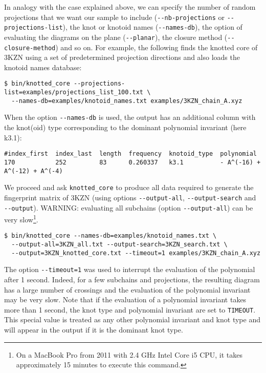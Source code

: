 In analogy with the case explained above, we can specify the number of random projections that we want our sample to include (\lstinline{--nb-projections} or \lstinline{--projections-list}), the knot or knotoid names (\lstinline{--names-db}), the option of evaluating the diagrams on the plane (\lstinline{--planar}), the closure method (\lstinline{--closure-method}) and so on. For example, the following finds the knotted core of 3KZN using a set of predetermined projection directions and also loads the knotoid names database:
\begin{lstlisting}
$ bin/knotted_core --projections-list=examples/projections_list_100.txt \ 
  --names-db=examples/knotoid_names.txt examples/3KZN_chain_A.xyz
\end{lstlisting}
When the option \lstinline{--names-db} is used, the output has an additional column with the knot(oid) type corresponding to the dominant polynomial invariant (here k3.1):
\begin{lstlisting}
#index_first  index_last  length  frequency  knotoid_type  polynomial
170           252         83      0.260337   k3.1          - A^(-16) + A^(-12) + A^(-4)
\end{lstlisting}



We proceed and ask \lstinline{knotted_core} to produce all data required to generate the fingerprint matrix of 3KZN (using options \lstinline{--output-all}, \lstinline{--output-search} and \lstinline{--output}). WARNING: evaluating all subchains (option \lstinline{--output-all}) can be very slow\footnote{On a MacBook Pro from 2011 with 2.4 GHz Intel Core i5 CPU, it takes approximately 15 minutes to execute this command.}.
\begin{lstlisting}
$ bin/knotted_core --names-db=examples/knotoid_names.txt \
  --output-all=3KZN_all.txt --output-search=3KZN_search.txt \
  --output=3KZN_knotted_core.txt --timeout=1 examples/3KZN_chain_A.xyz
\end{lstlisting}
The option \lstinline{--timeout=1} was used to interrupt the evaluation of the polynomial after 1 second. Indeed, for a few subchains and projections, the resulting diagram has a large number of crossings and the evaluation of the polynomial invariant may be very slow. Note that if the evaluation of a polynomial invariant takes more than 1 second, the knot type and polynomial invariant are set to \lstinline{TIMEOUT}. This special value is treated as any other polynomial invariant and knot type and will appear in the output if it is the dominant knot type.

